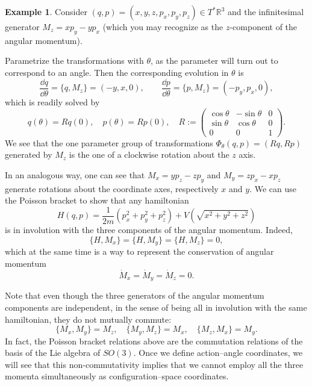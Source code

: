 \documentclass[english,fontsize=11pt,paper=b5]{scrbook}
\numberwithin{equation}{chapter}
\theoremstyle{definition}
\newtheorem{example}{Example}[chapter]
\begin{document}
    \begin{example}
      Consider $(q,p) = (x,y,z,p_x,p_y,p_z)\in T^* \mathbb{R}^3$ and the infinitesimal generator $M_z = x p_y - y p_x$ (which you may recognize as the $z$-component of the angular momentum).

      Parametrize the transformations with $\theta$, as the parameter will turn out to correspond to an angle. Then the corresponding evolution in $\theta$ is
      \begin{equation}
        \frac{\dd q}{\dd\theta} = \big\{q, M_z\big\} = (-y, x, 0),\qquad
        \frac{\dd p}{\dd\theta} = \big\{p, M_z\big\} = (-p_y, p_x, 0),
      \end{equation}
      which is readily solved by
      \begin{equation}
        q(\theta)= R q(0), \quad p(\theta) = R p(0), \quad
        R := \begin{pmatrix}
          \cos\theta & -\sin\theta & 0 \\
          \sin\theta & \cos\theta  & 0 \\
          0          & 0           & 1
        \end{pmatrix}.
      \end{equation}
      We see that the one parameter group of transformations $\Phi_\theta(q,p) = (Rq, Rp)$ generated by $M_z$ is the one of a clockwise rotation about the $z$ axis.

      In an analogous way, one can see that $M_x = yp_z-zp_y$ and $M_y = zp_x - xp_z$ generate rotations about the coordinate axes, respectively $x$ and $y$.
      We can use the Poisson bracket to show that any hamiltonian
      \begin{equation}
        H(q,p) = \frac1{2m}\left(p_x^2 + p_y^2 + p_z^2\right) + V\left(\sqrt{x^2 + y^2 + z^2}\right)
      \end{equation}
      is in involution with the three components of the angular momentum. Indeed,
      \begin{equation}
        \big\{H,M_x\big\} = \big\{H,M_y\big\} = \big\{H,M_z\big\} = 0,
      \end{equation}
      which at the same time is a way to represent the conservation of angular momentum
      \begin{equation}
        \dot M_x = \dot M_y = \dot M_z = 0.
      \end{equation}

      Note that even though the three generators of the angular momentum components are independent, in the sense of being all in involution with the same hamiltonian, they do not mutually commute:
      \begin{equation}\label{eq:commM}
        \big\{M_x, M_y\big\} = M_z, \quad
        \big\{M_y, M_z\big\} = M_x, \quad
        \big\{M_z, M_x\big\} = M_y.
      \end{equation}
      In fact, the Poisson bracket relations above are the commutation relations of the basis of the Lie algebra of $SO(3)$. %
      Once we define action--angle coordinates, we will see that this non-commutativity implies that we cannot employ all the three momenta simultaneously as configuration--space coordinates.


\end{example}
\end{document}
